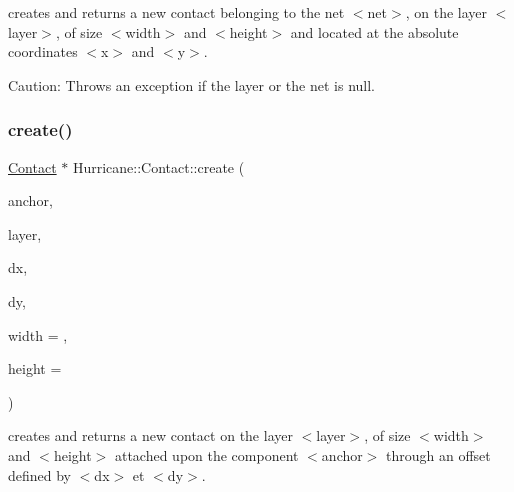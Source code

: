creates and returns a new contact belonging to the net {\ttfamily $<$net$>$}, on the layer {\ttfamily $<$layer$>$}, of size {\ttfamily $<$width$>$} and {\ttfamily $<$height$>$} and located at the absolute coordinates {\ttfamily $<$x$>$} and {\ttfamily $<$y$>$}.

\begin{DoxyParagraph}{Caution\+: Throws an exception if the layer or the net is null. }

\end{DoxyParagraph}
\mbox{\label{classHurricane_1_1Contact_a2e555edb8984b599c391f16db105c1f5}} 
\subsubsection{\texorpdfstring{create()}{create()}\hspace{0.1cm}{\footnotesize\ttfamily [2/2]}}
{\footnotesize\ttfamily \mbox{\hyperlink{classHurricane_1_1Contact}{Contact}} $\ast$ Hurricane\+::\+Contact\+::create (\begin{DoxyParamCaption}\item[{\mbox{\hyperlink{classHurricane_1_1Component}{Component}} $\ast$}]{anchor,  }\item[{const \mbox{\hyperlink{classHurricane_1_1Layer}{Layer}} $\ast$}]{layer,  }\item[{\mbox{\hyperlink{group__DbUGroup_ga4fbfa3e8c89347af76c9628ea06c4146}{Db\+U\+::\+Unit}}}]{dx,  }\item[{\mbox{\hyperlink{group__DbUGroup_ga4fbfa3e8c89347af76c9628ea06c4146}{Db\+U\+::\+Unit}}}]{dy,  }\item[{\mbox{\hyperlink{group__DbUGroup_ga4fbfa3e8c89347af76c9628ea06c4146}{Db\+U\+::\+Unit}}}]{width = {},  }\item[{\mbox{\hyperlink{group__DbUGroup_ga4fbfa3e8c89347af76c9628ea06c4146}{Db\+U\+::\+Unit}}}]{height = {} }\end{DoxyParamCaption})\hspace{0.3cm}{\ttfamily [static]}}

creates and returns a new contact on the layer {\ttfamily $<$layer$>$}, of size {\ttfamily $<$width$>$} and {\ttfamily $<$height$>$} attached upon the component {\ttfamily $<$anchor$>$} through an offset defined by {\ttfamily $<$dx$>$} et {\ttfamily $<$dy$>$}.

